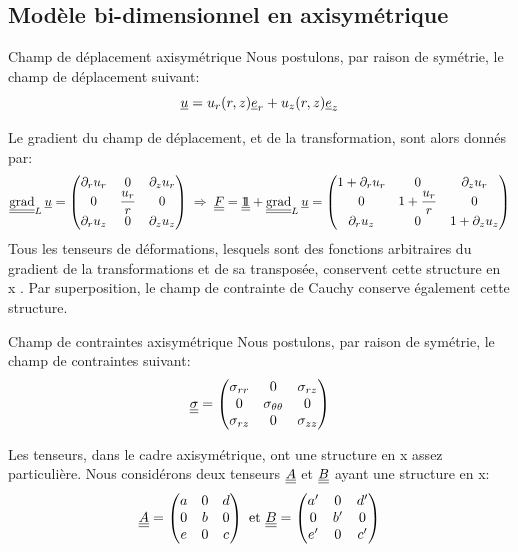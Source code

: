 \documentclass[10pt]{book}
\begin{document}
\subsection{Modèle bi-dimensionnel en axisymétrique}\label{Subsection:Modèle bi-dimensionnel en axisymétrique}
\begin{Hypothese}{Champ de déplacement \og axisymétrique \fg{}} Nous postulons, par raison de symétrie, le champ de déplacement suivant:
$$\underline{u}=u_{r}(r,z)\underline{e}_{r}+u_{z}(r,z)\underline{e}_{z}$$
\end{Hypothese}
Le gradient du champ de déplacement, et de la transformation, sont alors donnés par:
$$\tgrad_{L}\Dep=\begin{pmatrix}
\partial_{r}u_{r} & 0 & \partial_{z}u_{r}\\
0 & \dfrac{u_{r}}{r} & 0\\
\partial_{r}u_{z} & 0 & \partial_{z}u_{z}
\end{pmatrix} \implique \GT =\TU+\tgrad_{L}\Dep =\begin{pmatrix}
1+\partial_{r}u_{r} & 0 & \partial_{z}u_{r}\\
0 & 1+\dfrac{u_{r}}{r} & 0\\
\partial_{r}u_{z} & 0 & 1+\partial_{z}u_{z}
\end{pmatrix}$$
Tous les tenseurs de déformations, lesquels sont des fonctions arbitraires du gradient de la transformations et de sa transposée, conservent cette structure \og en x \fg{}. Par superposition, le champ de contrainte de Cauchy conserve également cette structure.
\begin{Hypothese}{Champ de contraintes \og axisymétrique \fg{}} Nous postulons, par raison de symétrie, le champ de contraintes suivant:
$$\underline{\underline{\sigma}}=\begin{pmatrix}
\sigma_{rr} & 0 & \sigma_{rz}\\
0 & \sigma_{\theta\theta} & 0\\
\sigma_{rz} & 0 & \sigma_{zz}
\end{pmatrix}$$
\end{Hypothese}
Les tenseurs, dans le cadre axisymétrique, ont une structure \og en x \fg{} assez particulière. Nous considérons deux tenseurs $\underline{\underline{A}}$ et $\underline{\underline{B}}$ ayant une structure en x: 
$$\underline{\underline{A}}=\begin{pmatrix}
a & 0 & d\\
0 & b & 0\\
e & 0 & c
\end{pmatrix} \text{ et } \underline{\underline{B}}=\begin{pmatrix}
a' & 0 & d'\\
0 & b' & 0\\
e' & 0 & c'
\end{pmatrix}$$
\end{document}

